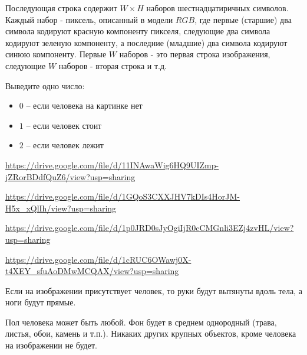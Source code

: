 Последующая строка содержит $W \times H$ наборов шестнадцатиричных символов. Каждый набор - пиксель, описанный в модели $RGB$, где первые (старшие) два символа кодируют красную компоненту пикселя, следующие два символа кодируют зеленую компоненту, а последние (младшие) два символа кодируют синюю компоненту.
Первые $W$ наборов - это первая строка изображения, следующие $W$ наборов - вторая строка и т.д.

\outputfmtSection

Выведите одно число:
\begin{itemize}
  \item $0$ -- если человека на картинке нет
  \item $1$ -- если человек стоит
  \item $2$ -- если человек лежит
\end{itemize}

\exampleSection

\url{https://drive.google.com/file/d/11INAwaWig6HQ9UIZmp-jZRorBDdfQuZ6/view?usp=sharing}

\url{https://drive.google.com/file/d/1GQoS3CXXJHV7kDIs4HorJM-H5x_xQlIh/view?usp=sharing}

\url{https://drive.google.com/file/d/1p0JRD0sJyOgiIjR0cCMGnli3EZj4zvHL/view?usp=sharing}

\url{https://drive.google.com/file/d/1cRUC6OWawj0X-t4XEY_sfuAoDMwMCQAX/view?usp=sharing}

\commentsSection

Если на изображении присутствует человек, то руки будут вытянуты вдоль тела, а ноги будут прямые.

Пол человека может быть любой.
Фон будет в среднем однородный (трава, листья, обои, камень и т.п.). Никаких других крупных объектов, кроме человека на изображении не будет.

